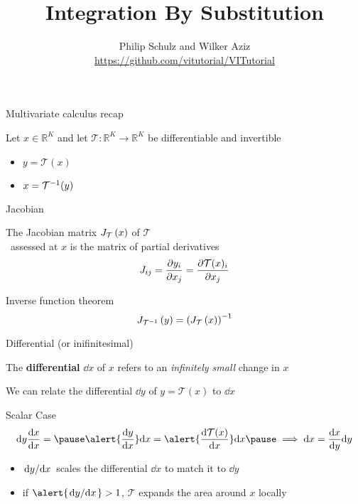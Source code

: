\documentclass[14pt,dvipsnames, aspectratio=169]{beamer}
\title{Integration By Substitution}
\author{Philip Schulz and Wilker Aziz\\
\url{https://github.com/vitutorial/VITutorial}}
\date{}
\begin{document}
\begin{frame}
\maketitle
\end{frame}

\begin{frame}{Multivariate calculus recap}

Let $x \in \mathbb R^K$ and let $\mathcal T: \mathbb R^K \to \mathbb R^K$ be differentiable and invertible
\begin{itemize}
	\item $y = \mathcal T(x) $
	\item $x = {\mathcal T}^{-1}(y)$
\end{itemize}

\end{frame}

\begin{frame}{Jacobian}

	The Jacobian matrix $J_{\mathcal T}\left(x\right) $ of  $\mathcal T$ \\
	~assessed at $x$ is the matrix of partial derivatives
	\begin{equation*}
		J_{ij} = \pdv{y_i}{x_j} = \pdv{\mathcal{T}(x)_{i}}{x_{j}}
	\end{equation*} 
	
	\pause
	Inverse function theorem
	\begin{equation*}
		J_{{\mathcal T}^{-1}}\left(y\right) = \left( J_{\mathcal T}\left(x\right) \right)^{-1}
	\end{equation*}
	
\end{frame}

\begin{frame}{Differential (or inifinitesimal)}

	The {\bf differential} $\dd x$ of $x$ refers to an \emph{infinitely small} change in $x$\\ \pause
	\vspace{10pt}

	We can relate the differential $\dd y$ of $y = \mathcal T(x)$ to $\dd x$ \pause
	\begin{block}{Scalar Case}
		\begin{equation*}
			\dd y \dv{x}{x} = \pause \alert{\dv{y}{x}} \dd x = \alert{\dv{\mathcal{T}(x)}{x}} \dd x \pause \implies \dd x = \dv{x}{y} \dd y
		\end{equation*}
		\pause
		\begin{itemize}
		\item \alert{$\dv*{y}{x}$} scales the differential $ \dd x $ to match it to $ \dd y $
		\item if $ \alert{\dv*{y}{x}} > 1 $, $ \mathcal{T} $ expands the area around $ x $ locally
		\end{itemize}
	\end{block}

\end{frame}
\end{document}
